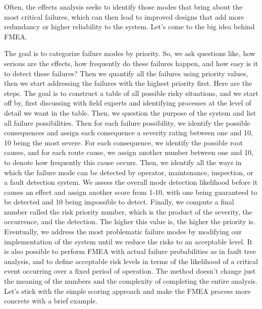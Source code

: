 Often, the effects analysis seeks to identify those modes that bring about the most critical failures, which can then lead to improved designs that add more 
redundancy or higher reliability to the system. Let's come to the big idea behind FMEA. 

The goal is to categorize failure modes by priority. So, we ask questions like, how serious are the effects, 
how frequently do these failures happen, and how easy is it to detect these failures? 
Then we quantify all the failures using priority values, then we start addressing the 
failures with the highest priority first. Here are the steps. 
The goal is to construct a table of all possible risky situations, and we start off by, 
first discussing with field experts and identifying processes at the level of detail we want in the table. 
Then, we question the purpose of the system and list all failure possibilities. 
Then for each failure possibility, we identify the possible consequences and assign each consequence a severity rating between one and 10, 10 being the most severe. 
For each consequence, we identify the possible root causes, and for each route cause, we assign another number between one and 10, 
to denote how frequently this cause occurs. Then, we identify all the ways in which the failure mode can be detected by operator, 
maintenance, inspection, or a fault detection system. We assess the overall mode detection likelihood before 
it causes an effect and assign another score from 1-10, with one being guaranteed to be detected and 10 being impossible to detect. 
Finally, we compute a final number called the risk priority number, which is the product of the severity, 
the occurrence, and the detection. The higher this value is, the higher the priority is. Eventually, we address the most problematic failure modes by 
modifying our implementation of the system until we reduce the risks to an acceptable level. 
It is also possible to perform FMEA with actual failure probabilities as in fault tree analysis, and to define acceptable risk levels in terms of the likelihood of a 
critical event occurring over a fixed period of operation. The method doesn't change just the meaning of the numbers and the complexity of completing the entire analysis. 
Let's stick with the simple scoring approach and make the FMEA process more concrete with a brief example. 

